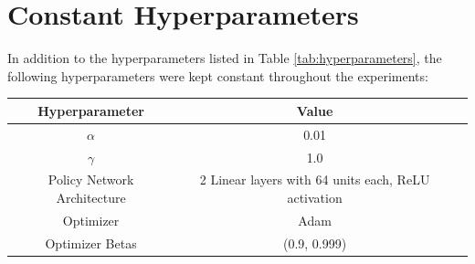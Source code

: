 \documentclass{article} %
\begin{document}
\section{Constant Hyperparameters}
In addition to the hyperparameters listed in Table \ref{tab:hyperparameters}, 
the following hyperparameters were kept constant throughout the experiments:

\begin{tabular}{ccc}
    \toprule
    Hyperparameter & Value \\
    \midrule
    $\alpha$ & 0.01 \\
    $\gamma$ & 1.0 \\
    Policy Network Architecture & 2 Linear layers with 64 units each, ReLU activation \\
    Optimizer & Adam \\
    Optimizer Betas & (0.9, 0.999) \\
    \bottomrule
\end{tabular}
\end{document}
